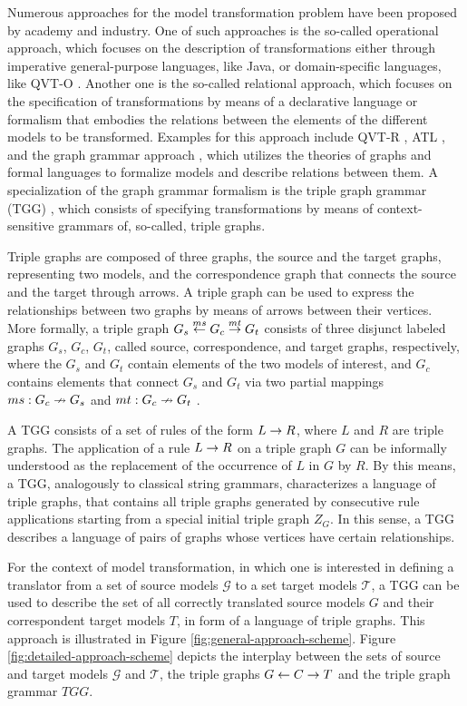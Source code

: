 Numerous approaches for the model transformation problem have been proposed by academy and industry. One of such approaches is the so-called operational approach, which focuses on the description of transformations either through imperative general-purpose languages, like Java, or domain-specific languages, like QVT-O \cite{omg2008meta}. Another one is the so-called relational approach, which focuses on the specification of transformations by means of a declarative language or formalism that embodies the relations between the elements of the different models to be transformed. Examples for this approach include QVT-R \cite{omg2008meta}, ATL \cite{jouault2006atl}, and the graph grammar approach \cite{ehrig1999handbook}, which utilizes the theories of graphs and formal languages to formalize models and describe relations between them. A specialization of the graph grammar formalism is the triple graph grammar (TGG) \cite{schurr1994specification}, which consists of specifying transformations by means of context-sensitive grammars of, so-called, triple graphs.

Triple graphs are composed of three graphs, the source and the target graphs, representing two models, and the correspondence graph that connects the source and the target through arrows. A triple graph can be used to express the relationships between two graphs by means of arrows between their vertices. More formally, a triple graph $G_s \overset{ms}{\leftarrow} G_c \overset{mt}{\rightarrow} G_t$ consists of three disjunct labeled graphs $G_s$, $G_c$, $G_t$, called source, correspondence, and target graphs, respectively, where the $G_s$ and $G_t$ contain elements of the two models of interest, and $G_c$ contains elements that connect $G_s$ and $G_t$ via two partial mappings $ms: G_c \nrightarrow G_s$ and $mt: G_c \nrightarrow G_t$ \cite{schurr1994specification}.

A TGG consists of a set of rules of the form $L \to R$, where $L$ and $R$ are triple graphs. The application of a rule $L \to R$ on a triple graph $G$ can be informally understood as the replacement of the occurrence of $L$ in $G$ by $R$. By this means, a TGG, analogously to classical string grammars, characterizes a language of triple graphs, that contains all triple graphs generated by consecutive rule applications starting from a special initial triple graph $Z_G$. In this sense, a TGG describes a language of pairs of graphs whose vertices have certain relationships.

For the context of model transformation, in which one is interested in defining a translator from a set of source models $\mathcal{G}$ to a set target models $\mathcal{T}$, a TGG can be used to describe the set of all correctly translated source models $G$ and their correspondent target models $T$, in form of a language of triple graphs. This approach is illustrated in Figure \ref{fig:general-approach-scheme}. Figure \ref{fig:detailed-approach-scheme} depicts the interplay between the sets of source and target models $\mathcal{G}$ and $\mathcal{T}$, the triple graphs $G \overset{}{\leftarrow} C \overset{}{\rightarrow} T$ and the triple graph grammar $TGG$.

